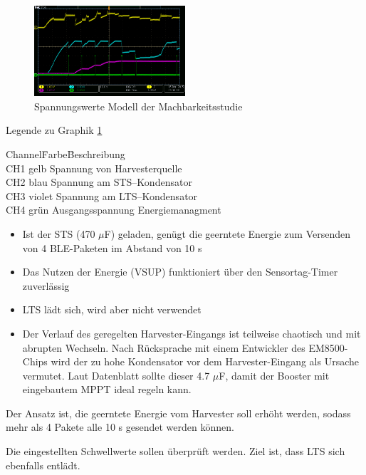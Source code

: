\begin{figure}[ht]
    \includegraphics[width=0.5\textwidth]{3Vorgehen/imag/messungPA.png}
    \caption{Spannungswerte Modell der Machbarkeitsstudie}\label{spannungMachbarkeit} 
\end{figure}

Legende zu Graphik \ref{spannungMachbarkeit}
\begin{tabbing}
    Channel\quad\= Farbe\quad\= Beschreibung\\[0.8ex]
    CH1\> gelb\> Spannung von Harvesterquelle\\
    CH2\> blau\> Spannung am STS--Kondensator\\
    CH3\> violet\> Spannung am LTS--Kondensator\\
    CH4\> grün\> Ausgangsspannung Energiemanagment\\
\end{tabbing}

\begin{itemize}
 \item Ist der STS (470 $\mu$F) geladen, genügt die geerntete Energie zum Versenden von 4 BLE-Paketen im Abstand von 10 s
 \item Das Nutzen der Energie (VSUP) funktioniert über den Sensortag-Timer zuverlässig 
 \item LTS lädt sich, wird aber nicht verwendet 
 \item Der Verlauf des geregelten Harvester-Eingangs ist teilweise chaotisch und mit abrupten Wechseln. Nach Rücksprache mit einem Entwickler des EM8500-Chips wird der zu hohe Kondensator vor dem Harvester-Eingang als Ursache vermutet. Laut Datenblatt sollte dieser 4.7 $\mu$F, damit der Booster mit eingebautem MPPT ideal regeln kann.
\end{itemize} 

Der Ansatz ist, die geerntete Energie vom Harvester soll erhöht werden, sodass mehr als 4 Pakete alle 10 s gesendet werden können.

Die eingestellten Schwellwerte sollen überprüft werden. Ziel ist, dass LTS sich ebenfalls entlädt.


